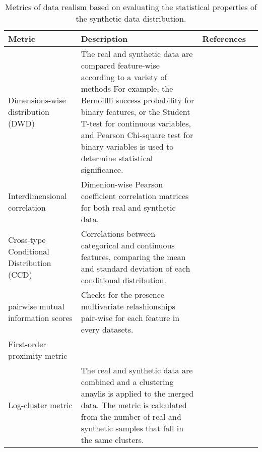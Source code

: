 \begin{table}
        \footnotesize
        \caption{Metrics of data realism based on evaluating the statistical properties of the synthetic data distribution. \label{tab:statistical}} 
        
        \begin{tabular}{@{} p{} p{} p{} p{} @{}}\toprule
            Metric & Description & References\\ \midrule
            
            Dimensions-wise distribution (DWD) & The real and synthetic data are compared feature-wise according to a variety of methods For example, the Bernoillli success probability for binary features, or the Student T-test for continuous variables, and Pearson Chi-square test for binary variables is used to determine statistical significance.& \cite{Beaulieu-Jones2019-ct,choi2017generating,chin2019generation,yan2020generating,Baowaly2019,Baowaly_2019,ozyigit2020generation,tanti2019, Yoon2020-anon, tanti2019}\\
            
            
            Interdimensional correlation & Dimenion-wise Pearson coefficient correlation matrices for both real and synthetic data. & \cite{Beaulieu-Jones2019-ct, Goncalves2020, torfi2019generating,Frid_Adar_2018,Yang_2019,ozyigit2020generation, Yang_2019_ehr, Yoon2020-anon}\\
           
            Cross-type Conditional Distribution (CCD) & Correlations between categorical and continuous features, comparing the mean and standard deviation of each conditional distribution. & \cite{yan2020generating}\\
            
            pairwise mutual information scores & Checks for the presence multivariate relashionships pair-wise for each feature in every datasets. & \cite{Rankin2020}\\
            
            First-order proximity metric & {} & \cite{Zhang2020-wp}\\
            
            Log-cluster metric & The real and synthetic data are combined and a clustering anaylis is applied to the merged data. The metric is calculated from the number of real and synthetic samples that fall in the same clusters.  & \cite{Goncalves2020}\\
            

\end{tabular}
\end{table}

